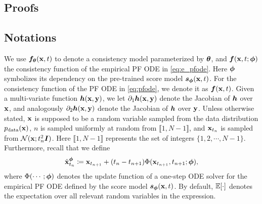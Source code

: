 \setcounter{tocdepth}{4}
\tableofcontents
\allowdisplaybreaks
\begin{appendices}
\section{Proofs}\label{app:proof}
\subsection{Notations}
We use ${\bm{f}}_{{\bm{\theta}}}({\mathbf{x}}, t)$ to denote a consistency model parameterized by ${\bm{\theta}}$, and ${\bm{f}}({\mathbf{x}}, t; {\bm{\phi}})$ the consistency function of the empirical PF ODE in \cref{eq:e_pfode}. Here ${\bm{\phi}}$ symbolizes its dependency on the pre-trained score model ${\bm{s}}_{\bm{\phi}}({\mathbf{x}}, t)$. For the consistency function of the PF ODE in \cref{eq:pfode}, we denote it as ${\bm{f}}({\mathbf{x}}, t)$. Given a multi-variate function ${\bm{h}}({\mathbf{x}}, {\mathbf{y}})$, we let $\partial_1 {\bm{h}}({\mathbf{x}}, {\mathbf{y}})$ denote the Jacobian of ${\bm{h}}$ over ${\mathbf{x}}$, and analogously $\partial_2 {\bm{h}}({\mathbf{x}}, {\mathbf{y}})$ denote the Jacobian of ${\bm{h}}$ over ${\mathbf{y}}$. Unless otherwise stated, ${\mathbf{x}}$ is supposed to be a random variable sampled from the data distribution $p_\text{data}({\mathbf{x}})$, $n$ is sampled uniformly at random from $\llbracket 1, N-1 \rrbracket$, and ${\mathbf{x}}_{t_{n}}$ is sampled from $\mathcal{N}({\mathbf{x}}; t_n^2 {\bm{I}})$. Here $\llbracket 1, N-1 \rrbracket$ represents the set of integers $\{1,2,\cdots, N-1\}$. Furthermore, recall that we define
\begin{align*}
    \hat{{\mathbf{x}}}_{t_n}^{\bm{\phi}} \coloneqq {\mathbf{x}}_{t_{n+1}} + (t_n - t_{n+1})\Phi({\mathbf{x}}_{t_{n+1}}, t_{n+1}; {\bm{\phi}}),
\end{align*}
where $\Phi(\cdots; {\bm{\phi}})$ denotes the update function of a one-step ODE solver for the empirical PF ODE defined by the score model ${\bm{s}}_{\bm{\phi}}({\mathbf{x}}, t)$. By default, $\mathbb{E}[\cdot]$ denotes the expectation over all relevant random variables in the expression.


\end{appendices}
